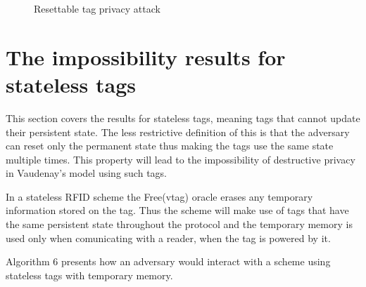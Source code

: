     \begin{figure}[H]
    \hspace*{0.5cm}
    \caption{Resettable tag privacy attack}
    \end{figure}

\section{The impossibility results for stateless tags}

    This section covers the results for stateless tags, meaning tags that cannot update their persistent state. The less restrictive definition of this is that
    the adversary can reset only the permanent state thus making the tags use the same state multiple times. This property will lead to the 
    impossibility of destructive privacy in Vaudenay's model using such tags. 

    In a stateless RFID scheme the Free(vtag) oracle erases any temporary information stored on the tag. Thus the scheme will make use of tags that have the same
    persistent state throughout the protocol and the temporary memory is used only when comunicating with a reader, when the tag is powered by it.

    Algorithm 6 presents how an adversary would interact with a scheme using stateless tags with temporary memory.

